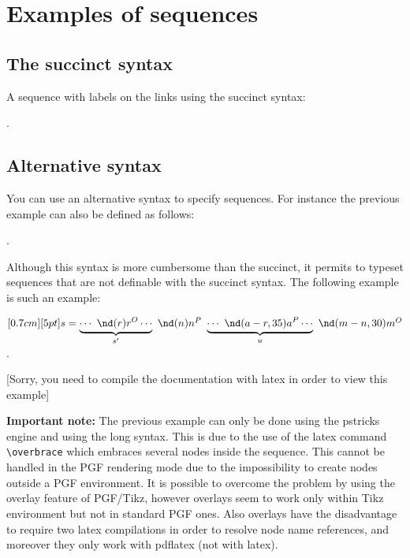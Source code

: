 \section{Examples of sequences}

\subsection{The succinct syntax}
A sequence with labels on the links using the succinct syntax:
\begin{codeexample}[width=7cm]
.
\end{codeexample}

\subsection{Alternative syntax}
You can use an alternative syntax to specify sequences. For instance the previous example
can also be defined as follows:
\begin{codeexample}[width=7cm]
.
\end{codeexample}
Although this syntax is more cumbersome than the succinct, it permits to typeset sequences that are
not definable with the succinct syntax. The following example is such an example:
\ifLoadPSengine
\begin{codeexample}[width=6cm]
$\pstr[0.7cm][5pt]{ s = \underbrace{\cdots\ \nd(r){r}^O
\cdots }_{s'}\ \nd(n){n}^P
\ \underbrace{\cdots\ \nd(a-r,35){a}^P \cdots }_{u}
\ \nd(m-n,30){m}^O }$.
\end{codeexample}
\else
\vskip 10pt
[Sorry, you need to compile the documentation with latex in order to view this example]
\vskip 10pt
\fi

{\bf Important note:}
The previous example can only be done using the pstricks engine and using the long syntax. This is due to the use of the
latex command \verb|\overbrace| which embraces several nodes inside the sequence.
This cannot be handled in the PGF rendering mode due to the impossibility to create nodes outside a PGF environment.
It is possible to overcome the problem by using the overlay feature of PGF/Tikz, however overlays seem to work only
within Tikz environment but not in standard PGF ones. Also overlays have the disadvantage
to require two latex compilations in order to resolve node name references, and moreover they only work with pdflatex (not with latex).


